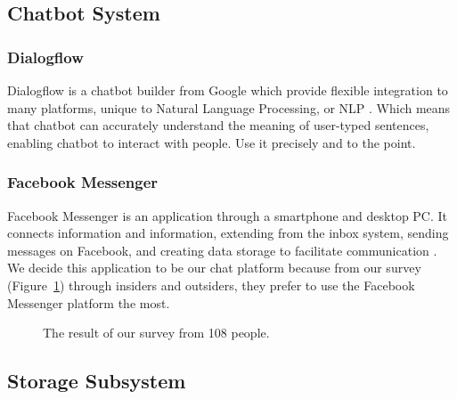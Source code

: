 \documentclass[12pt,oneside,openright,a4paper]{cpe-english-project}
\begin{document}
\subsection{Chatbot System}
\subsubsection{Dialogflow}
Dialogflow is a chatbot builder from Google which provide flexible integration to many platforms,
unique to Natural Language Processing, or NLP \cite{dialogflow}. Which means that chatbot can
accurately understand the meaning of user-typed sentences, enabling chatbot to interact with people.
Use it precisely and to the point.

\subsubsection{Facebook Messenger}
Facebook Messenger is an application through a smartphone and desktop PC. It connects information
and information, extending from the inbox system, sending messages on Facebook, and creating data
storage to facilitate communication \cite{wiki_fb_messenger}.\\
We decide this application to be our chat platform because from our survey (Figure~\ref*{fig:ch3_result_survey})
through insiders and outsiders, they prefer to use the Facebook Messenger platform the most.

\begin{figure}[h!]
  \centering
  \setlength{\fboxrule}{0.2mm}
  \setlength{\fboxsep}{0.5cm}
  \caption{The result of our survey from 108 people.}
  \label{fig:ch3_result_survey}
\end{figure}

\subsection{ Storage Subsystem}
\end{document}
